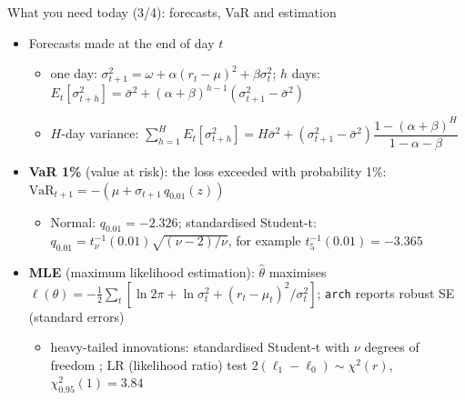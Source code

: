 \begin{frame}{What you need today (3/4): forecasts, VaR and estimation}
\itemsize{\small}
\begin{itemize}
    \item Forecasts made at the end of day $t$
    \begin{itemize}
        \item one day: $\sigma_{t+1}^2 = \omega + \alpha(r_t - \mu)^2 + \beta\sigma_t^2$; $h$ days: $E_t[\sigma_{t+h}^2] = \bar\sigma^2 + (\alpha + \beta)^{h-1}(\sigma_{t+1}^2 - \bar\sigma^2)$
        \item $H$-day variance: $\sum_{h=1}^{H}E_t[\sigma_{t+h}^2] = H\bar\sigma^2 + (\sigma_{t+1}^2 - \bar\sigma^2)\dfrac{1 - (\alpha + \beta)^H}{1 - \alpha - \beta}$
    \end{itemize}
    \item \textbf{VaR 1\%} (value at risk): the loss exceeded with probability 1\%: $\mathrm{VaR}_{t+1} = -(\mu + \sigma_{t+1}\,q_{0.01}(z))$
    \begin{itemize}
        \item Normal: $q_{0.01} = -2.326$; standardised Student-t: $q_{0.01} = t_\nu^{-1}(0.01)\sqrt{(\nu - 2)/\nu}$, for example $t_5^{-1}(0.01) = -3.365$
    \end{itemize}
    \item \textbf{MLE} (maximum likelihood estimation): $\hat\theta$ maximises $\ell(\theta) = -\frac12\sum_t[\ln 2\pi + \ln\sigma_t^2 + (r_t - \mu_t)^2/\sigma_t^2]$; \texttt{arch} reports robust SE (standard errors) 
    \begin{itemize}
        \item heavy-tailed innovations: standardised Student-t with $\nu$ degrees of freedom ; LR (likelihood ratio) test $2(\ell_1 - \ell_0) \sim \chi^2(r)$, $\chi^2_{0.95}(1) = 3.84$
    \end{itemize}
\end{itemize}
\end{frame}

